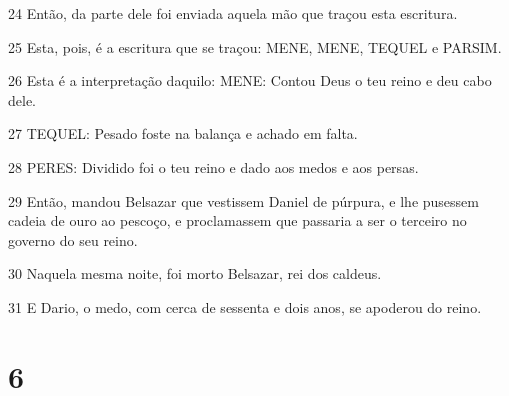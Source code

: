 \par 24 Então, da parte dele foi enviada aquela mão que traçou esta escritura.
\par 25 Esta, pois, é a escritura que se traçou: MENE, MENE, TEQUEL e PARSIM.
\par 26 Esta é a interpretação daquilo: MENE: Contou Deus o teu reino e deu cabo dele.
\par 27 TEQUEL: Pesado foste na balança e achado em falta.
\par 28 PERES: Dividido foi o teu reino e dado aos medos e aos persas.
\par 29 Então, mandou Belsazar que vestissem Daniel de púrpura, e lhe pusessem cadeia de ouro ao pescoço, e proclamassem que passaria a ser o terceiro no governo do seu reino.
\par 30 Naquela mesma noite, foi morto Belsazar, rei dos caldeus.
\par 31 E Dario, o medo, com cerca de sessenta e dois anos, se apoderou do reino.

\chapter{6}

